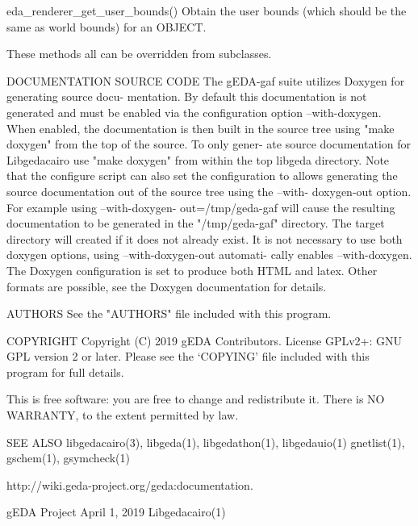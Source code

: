                 eda_renderer_get_user_bounds()
                    Obtain the user bounds (which should be the same as world
                    bounds) for an OBJECT.

              These methods all can be overridden from subclasses.

DOCUMENTATION
          SOURCE CODE
              The gEDA-gaf suite utilizes Doxygen for generating source  docu-
              mentation.  By  default  this documentation is not generated and
              must be enabled via  the  configuration  option  --with-doxygen.
              When enabled, the documentation is then built in the source tree
              using "make doxygen" from the top of the source. To only  gener-
              ate  source  documentation  for  Libgedacairo use "make doxygen"
              from within the top libgeda directory. Note that  the  configure
              script  can  also set the configuration to allows generating the
              source documentation out of the source tree  using  the  --with-
              doxygen-out    option.   For   example   using   --with-doxygen-
              out=/tmp/geda-gaf will cause the resulting documentation  to  be
              generated in the "/tmp/geda-gaf" directory. The target directory
              will created if it does not already exist. It is  not  necessary
              to  use both doxygen options, using --with-doxygen-out automati-
              cally enables --with-doxygen.  The Doxygen configuration is  set
              to  produce both HTML and latex. Other formats are possible, see
              the Doxygen documentation for details.

AUTHORS
       See the "AUTHORS" file included with this program.

COPYRIGHT
       Copyright (C) 2019 gEDA Contributors. License GPLv2+: GNU GPL
       version 2 or later. Please see the `COPYING' file included with this
       program for full details.

       This is free software: you are free to change and redistribute it.
       There is NO WARRANTY, to the extent permitted by law.

SEE ALSO
       libgedacairo(3), libgeda(1), libgedathon(1), libgedauio(1) gnetlist(1),
       gschem(1), gsymcheck(1)

       http://wiki.geda-project.org/geda:documentation.



gEDA Project                     April 1, 2019                 Libgedacairo(1)
